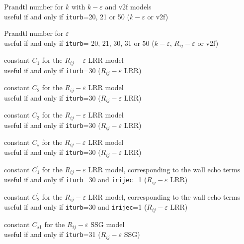 {Prandtl number for $k$ with $k-\varepsilon$ and v2f models\\
useful if and only if {\tt iturb}=20, 21 or 50
($k-\varepsilon$ or v2f)}

{Prandtl number for $\varepsilon$\\
useful if and only if {\tt iturb}= 20,
21, 30, 31 or 50 ($k-\varepsilon$, $R_{ij}-\varepsilon$ or v2f)}


{constant $C_1$ for the $R_{ij}-\varepsilon$ LRR model\\
useful if and only if {\tt iturb}=30
($R_{ij}-\varepsilon$ LRR)}

{constant $C_2$ for the $R_{ij}-\varepsilon$ LRR model\\
useful if and only if {\tt iturb}=30
($R_{ij}-\varepsilon$ LRR)}

{constant $C_3$ for the $R_{ij}-\varepsilon$ LRR model\\
useful if and only if {\tt iturb}=30
($R_{ij}-\varepsilon$ LRR)}

{constant $C_s$ for the $R_{ij}-\varepsilon$ LRR model\\
useful if and only if {\tt iturb}=30
($R_{ij}-\varepsilon$ LRR)}

{constant $C_1^\prime$ for the $R_{ij}-\varepsilon$ LRR model, corresponding to
the wall echo terms\\
useful if and only if {\tt iturb}=30
and {\tt irijec}=1
($R_{ij}-\varepsilon$ LRR)}

{constant $C_2^\prime$ for the $R_{ij}-\varepsilon$ LRR model, corresponding to
the wall echo terms\\
useful if and only if {\tt iturb}=30 and {\tt irijec}=1
($R_{ij}-\varepsilon$ LRR)}


{constant $C_{s1}$ for the $R_{ij}-\varepsilon$ SSG model\\
useful if and only if {\tt iturb}=31
($R_{ij}-\varepsilon$ SSG)}

